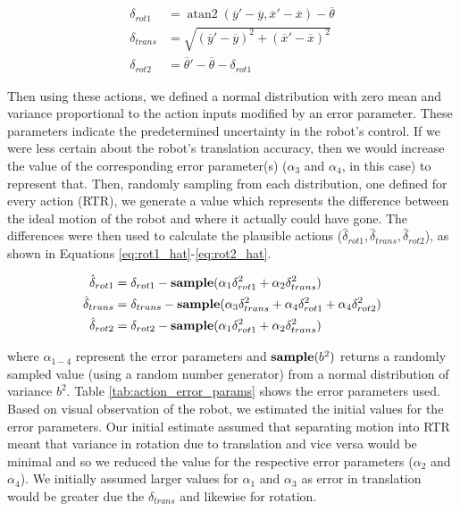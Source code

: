 \documentclass[journal]{IEEEtran}
\DeclareMathOperator{\atantwo}{atan2}
\begin{document}
            \begin{align}
                \delta_{rot1} &= \atantwo(\overline{y}'-\overline{y}, \overline{x}'-\overline{x}) - \overline{\theta}  \label{eq:rot1_calc}  \\     
                \delta_{trans} &= \sqrt{(\overline{y}'-\overline{y})^{2} + (\overline{x}'-\overline{x})^{2}}    \label{eq:trans_calc} \\            \delta_{rot2} &= \overline{\theta}' - \overline{\theta} - \delta_{rot1} \label{eq:rot2_calc}
            \end{align}
                
            
            Then using these actions, we defined a normal distribution with zero mean and variance proportional to the action inputs modified by an error parameter. These parameters indicate the predetermined uncertainty in the robot's control. If we were less certain about the robot's translation accuracy, then we would increase the value of the corresponding error parameter(s) ($\alpha_{3}$ and $\alpha_{4}$, in this case) to represent that. 
            Then, randomly sampling from each distribution, one defined for every action (RTR), we generate a value which represents the difference between the ideal motion of the robot and where it actually could have gone. The differences were then used to calculate the plausible actions ($\hat{\delta}_{rot1}, \hat{\delta}_{trans}, \hat{\delta}_{rot2}$), as shown in Equations \ref{eq:rot1_hat}-\ref{eq:rot2_hat}.
          
            \begin{align}
                \hat{\delta}_{rot1} &= \delta_{rot1} - \bold{sample}(\alpha_{1}\delta^{2}_{rot1} + \alpha_{2}\delta^{2}_{trans}) \label{eq:rot1_hat}  \\
                \hat{\delta}_{trans} &= \delta_{trans} - \bold{sample}(\alpha_{3}\delta^{2}_{trans} + \alpha_{4}\delta^{2}_{rot1} + \alpha_{4}\delta^{2}_{rot2}) \label{eq:trans_hat}  \\
                \hat{\delta}_{rot2} &= \delta_{rot2} - \bold{sample}(\alpha_{1}\delta^{2}_{rot1} + \alpha_{2}\delta^{2}_{trans}) \label{eq:rot2_hat}
            \end{align}
          
            where $\alpha_{1-4}$ represent the error parameters and $\bold{sample}(b^2)$ returns a randomly sampled value (using a random number generator) from a normal distribution of variance $b^2$. Table \ref{tab:action_error_params} shows the error parameters used. Based on visual observation of the robot, we estimated the initial values for the error parameters. Our initial estimate assumed that separating motion into RTR meant that variance in rotation due to translation and vice versa would be minimal and so we reduced the value for the respective error parameters ($\alpha_{2}$ and $\alpha_{4}$). We initially assumed larger values for $\alpha_{1}$ and $\alpha_{3}$ as error in translation would be greater due the $\delta_{trans}$ and likewise for rotation.
                
\end{document}
